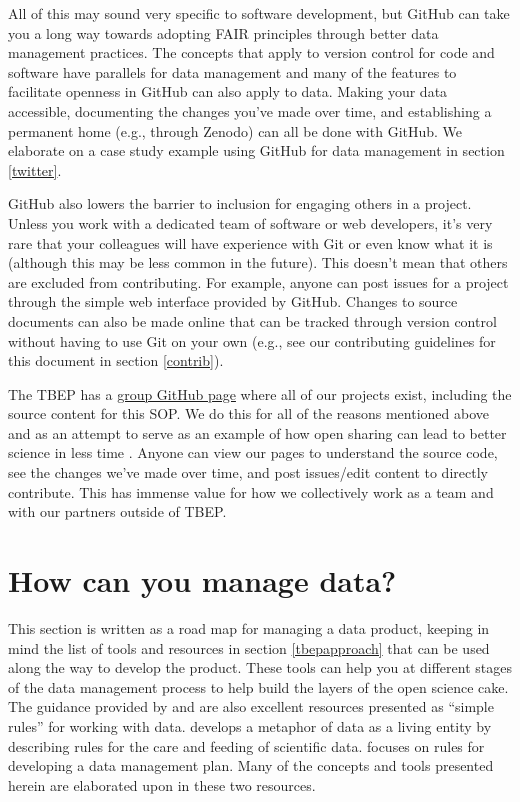 \documentclass[
]{book}
\begin{document}
All of this may sound very specific to software development, but GitHub can take you a long way towards adopting FAIR principles through better data management practices. The concepts that apply to version control for code and software have parallels for data management and many of the features to facilitate openness in GitHub can also apply to data. Making your data accessible, documenting the changes you've made over time, and establishing a permanent home (e.g., through Zenodo) can all be done with GitHub. We elaborate on a case study example using GitHub for data management in section \ref{twitter}.

GitHub also lowers the barrier to inclusion for engaging others in a project. Unless you work with a dedicated team of software or web developers, it's very rare that your colleagues will have experience with Git or even know what it is (although this may be less common in the future). This doesn't mean that others are excluded from contributing. For example, anyone can post issues for a project through the simple web interface provided by GitHub. Changes to source documents can also be made online that can be tracked through version control without having to use Git on your own (e.g., see our contributing guidelines for this document in section \ref{contrib}).

The TBEP has a \href{https://github.com/tbep-tech}{group GitHub page} where all of our projects exist, including the source content for this SOP. We do this for all of the reasons mentioned above and as an attempt to serve as an example of how open sharing can lead to better science in less time \citep{Lowndes17}. Anyone can view our pages to understand the source code, see the changes we've made over time, and post issues/edit content to directly contribute. This has immense value for how we collectively work as a team and with our partners outside of TBEP.

\hypertarget{howyou}{%
\section{How can you manage data?}\label{howyou}}

This section is written as a road map for managing a data product, keeping in mind the list of tools and resources in section \ref{tbepapproach} that can be used along the way to develop the product. These tools can help you at different stages of the data management process to help build the layers of the open science cake. The guidance provided by \citet{Goodman14} and \citet{Michener15} are also excellent resources presented as ``simple rules'' for working with data. \citet{Goodman14} develops a metaphor of data as a living entity by describing rules for the care and feeding of scientific data. \citet{Michener15} focuses on rules for developing a data management plan. Many of the concepts and tools presented herein are elaborated upon in these two resources.
\end{document}
